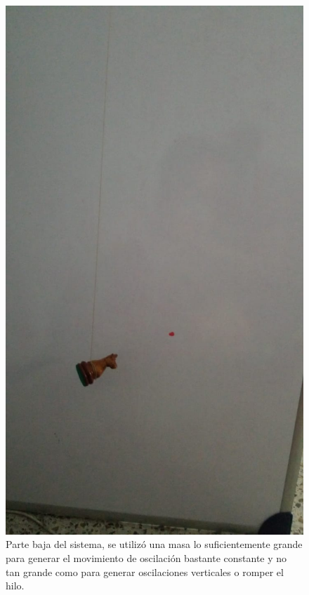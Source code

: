 \documentclass[conference]{IEEEtran}
\begin{document}
    \begin{figure}[H]
    	\centering
    	\includegraphics[scale=0.15]{fotos/2.jpeg}
    	\caption{Parte baja del sistema, se utilizó una masa lo suficientemente grande para generar el movimiento de oscilación bastante constante y no tan grande como para generar oscilaciones verticales o romper el hilo.}
    \end{figure}

    
\end{document}
